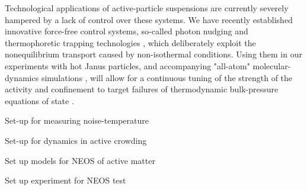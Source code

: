 \begin{workpackage}
\begin{tasklist}
\begin{task}[title=Active Brownian Particle Suspensions,id=task4,lead=ULEI,wphases=16-48]
Technological applications of active-particle suspensions  are
currently severely hampered by a lack of control over these systems.
%
We have recently established innovative force-free control systems, so-called photon nudging
and thermophoretic trapping technologies \cite{Qian2013,Braun:NanoLetters:2015}, which deliberately exploit 
the nonequilibrium transport caused by non-isothermal conditions.
%
Using them in our experiments with hot Janus particles, and accompanying "all-atom" molecular-dynamics 
simulations \cite{chakraborty-etal:2011}, will allow for a continuous tuning of the strength of 
the activity and confinement to target failures of thermodynamic bulk-pressure equations of
state \cite{ginot-etal:2015}.
\end{task}


\end{tasklist}

\printbibliography[heading=proposal-bib,env=proposal-env]

\begin{wpdelivs}
\begin{wpdeliv}[due=12,id=D2.3,dissem=PU,nature=R,lead=ULEI,miles=models]
      {Set-up for measuring noise-temperature}
  \end{wpdeliv}
  \begin{wpdeliv}[due=24,id=D2.1,dissem=PU,nature=R,lead=ULEI,miles=data1]
      {Set-up for dynamics in active crowding}
  \end{wpdeliv}
  \begin{wpdeliv}[due=24,id=D2.2,dissem=PU,nature=R,lead=ULEI,miles=data1]
      {Set up models for NEOS of active matter}
\end{wpdeliv}
  \begin{wpdeliv}[due=36,id=D2.4,dissem=PU,nature=R,lead=ULEI,miles=data2]
      {Set up experiment for NEOS test}
\end{wpdeliv}
\end{wpdelivs}

\end{workpackage}
